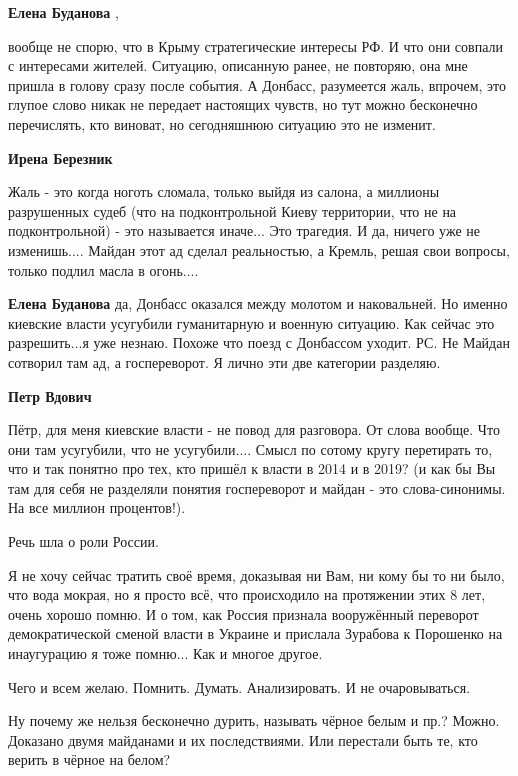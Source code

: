 \begin{itemize}
\begin{itemize}
\textbf{Елена Буданова} ,

вообще не спорю, что в Крыму стратегические интересы РФ. И что они совпали с
интересами жителей. Ситуацию, описанную ранее, не повторяю, она мне пришла в
голову сразу после события. А Донбасс, разумеется жаль, впрочем, это глупое слово
никак не передает настоящих чувств, но тут можно бесконечно перечислять, кто
виноват, но сегодняшнюю ситуацию это не изменит.


\textbf{Ирена Березник} 

Жаль - это когда ноготь сломала, только выйдя из салона, а миллионы разрушенных
судеб (что на подконтрольной Киеву территории, что не на подконтрольной) - это
называется иначе... Это трагедия. И да, ничего уже не изменишь.... Майдан этот
ад сделал реальностью, а Кремль, решая свои вопросы, только подлил масла в
огонь....

\textbf{Елена Буданова} да, Донбасс оказался между молотом и наковальней. Но именно киевские власти усугубили гуманитарную и военную ситуацию.
Как сейчас это разрешить...я уже незнаю. Похоже что поезд с Донбассом уходит.
РС. Не Майдан сотворил там ад, а госпереворот.
Я лично эти две категории разделяю.

\textbf{Петр Вдович} 

Пётр, для меня киевские власти - не повод для разговора. От слова вообще. Что
они там усугубили, что не усугубили.... Смысл по сотому кругу перетирать то,
что и так понятно про тех, кто пришёл к власти в 2014 и в 2019? (и как бы Вы
там для себя не разделяли понятия госпереворот и майдан - это слова-синонимы.
На все миллион процентов!).

Речь шла о роли России.

Я не хочу сейчас тратить своё время, доказывая ни Вам, ни кому бы то ни было,
что вода мокрая, но я просто всё, что происходило на протяжении этих 8 лет,
очень хорошо помню. И о том, как Россия признала вооружённый переворот
демократической сменой власти в Украине и прислала Зурабова к Порошенко на
инаугурацию я тоже помню... Как и многое другое.

Чего и всем желаю. Помнить. Думать. Анализировать. И не очаровываться.

\end{itemize} %

Ну почему же нельзя бесконечно дурить, называть чёрное белым и пр.?
Можно.
Доказано двумя майданами и их последствиями. Или перестали быть те, кто верить в чёрное на белом?


\end{itemize}
